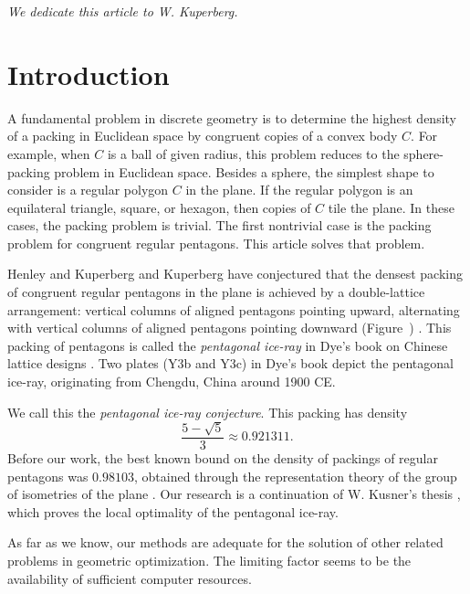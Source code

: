 \def\threepentnoD#1#2#3#4#5#6#7#8#9{%
\pen{#1}{#2}{#3};
\pen{#4}{#5}{#6};
\pen{#7}{#8}{#9}
}

\def\blankfig#1{\tikzfig{#1}{Insert graphic}
{
[scale=1]
\draw(0,) circle(1cm);
}}

\centerline{\it We dedicate this article to W. Kuperberg.}

\section{Introduction} 

A fundamental problem in discrete geometry is to determine the highest
density of a packing in Euclidean space by congruent copies of a
convex body $C$.  For example, when $C$ is a ball of given radius,
this problem reduces to the sphere-packing problem in Euclidean space.
Besides a sphere, the simplest shape to consider is a regular polygon
$C$ in the plane.  If the regular polygon is an equilateral
triangle, square, or hexagon, then copies of $C$ tile the plane.  In
these cases, the packing problem is trivial.  The first nontrivial
case is the packing problem for congruent regular pentagons.  This
article solves that problem.

Henley and Kuperberg and Kuperberg have conjectured that the densest
packing of congruent regular pentagons in the plane is achieved by a
double-lattice arrangement: vertical columns of aligned pentagons
pointing upward, alternating with vertical columns of aligned
pentagons pointing downward (Figure~)
\cite{Kup} \cite[p.801]{henley}.  This packing of pentagons is called
the {\it pentagonal ice-ray} in Dye's book on Chinese lattice designs
\cite{dye}.  Two plates (Y3b and Y3c) in Dye's book depict the
pentagonal ice-ray, originating from Chengdu, China around 1900 CE.

We call this the {\it pentagonal ice-ray  conjecture}.
This packing has density
\[
\frac{5 - \sqrt{5}}3 \approx 0.921311.
\] %
Before our work, the best known bound on the density of packings of
regular pentagons was $0.98103$, obtained through the representation
theory of the group of isometries of the plane \cite{Val}.  Our
research is a continuation of W. Kusner's thesis \cite{Kus}, which
proves the local optimality of the pentagonal ice-ray.

As far as we know, our methods are adequate for the solution of other
related problems in geometric optimization.  The limiting factor seems
to be the availability of sufficient computer resources.

